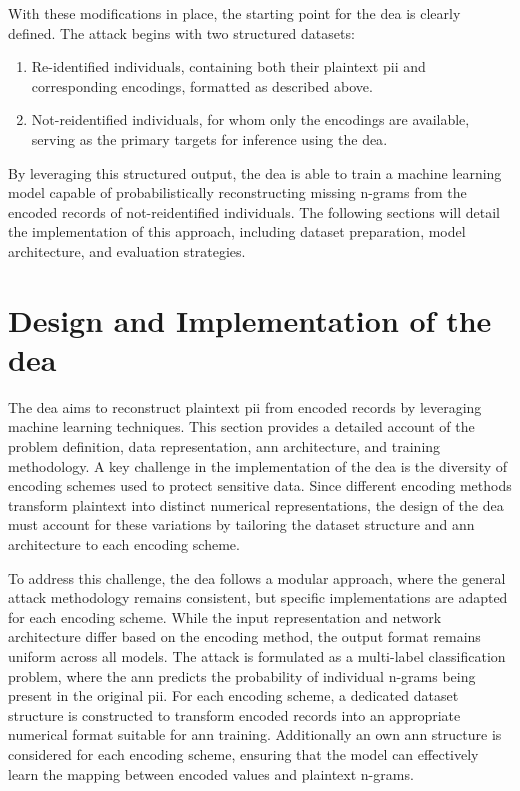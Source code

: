 With these modifications in place, the starting point for the \ac{dea} is clearly defined.
The attack begins with two structured datasets:

\begin{enumerate}
    \item Re-identified individuals, containing both their plaintext \ac{pii} and corresponding encodings, formatted as described above.
    \item Not-reidentified individuals, for whom only the encodings are available, serving as the primary targets for inference using the \ac{dea}.
\end{enumerate}

By leveraging this structured output, the \ac{dea} is able to train a machine learning model capable of probabilistically reconstructing missing n-grams from the encoded records of not-reidentified individuals.
The following sections will detail the implementation of this approach, including dataset preparation, model architecture, and evaluation strategies.

\section{Design and Implementation of the \ac{dea}} \label{sec:designandimplementation}

The \ac{dea} aims to reconstruct plaintext \ac{pii} from encoded records by leveraging machine learning techniques.
This section provides a detailed account of the problem definition, data representation, \ac{ann} architecture, and training methodology.
A key challenge in the implementation of the \ac{dea} is the diversity of encoding schemes used to protect sensitive data.
Since different encoding methods transform plaintext into distinct numerical representations, the design of the \ac{dea} must account for these variations by tailoring the dataset structure and \ac{ann} architecture to each encoding scheme.

To address this challenge, the \ac{dea} follows a modular approach, where the general attack methodology remains consistent, but specific implementations are adapted for each encoding scheme.
While the input representation and network architecture differ based on the encoding method, the output format remains uniform across all models.
The attack is formulated as a multi-label classification problem, where the \ac{ann} predicts the probability of individual n-grams being present in the original \ac{pii}.
For each encoding scheme, a dedicated dataset structure is constructed to transform encoded records into an appropriate numerical format suitable for \ac{ann} training.
Additionally an own \ac{ann} structure is considered for each encoding scheme, ensuring that the model can effectively learn the mapping between encoded values and plaintext n-grams.


